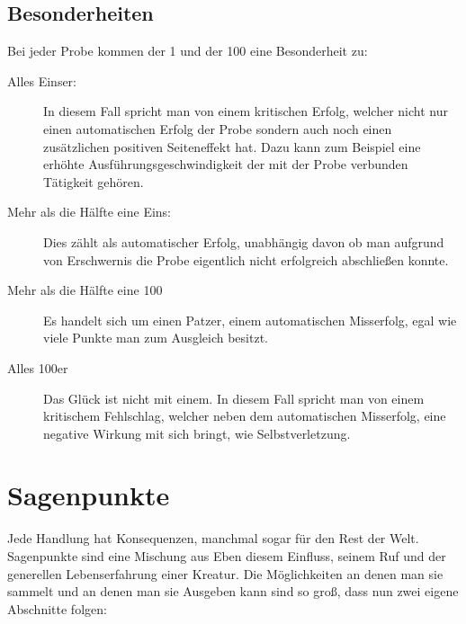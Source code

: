 \documentclass[a4paper,12pt,oneside]{book}
\begin{document}
\section{Besonderheiten}
Bei jeder Probe kommen der 1 und der 100 eine Besonderheit zu:
\begin{description}
\item[Alles Einser:]
In diesem Fall spricht man von einem kritischen Erfolg, welcher nicht nur einen automatischen Erfolg der Probe sondern auch noch einen zusätzlichen positiven Seiteneffekt hat. Dazu kann zum Beispiel eine erhöhte Ausführungsgeschwindigkeit der mit der Probe verbunden Tätigkeit gehören.
\item[Mehr als die Hälfte eine Eins:]
Dies zählt als automatischer Erfolg, unabhängig davon ob man aufgrund von Erschwernis die Probe eigentlich nicht erfolgreich abschließen konnte.
\item[Mehr als die Hälfte eine 100]
Es handelt sich um einen Patzer, einem automatischen Misserfolg, egal wie viele Punkte man zum Ausgleich besitzt.
\item[Alles 100er]
Das Glück ist nicht mit einem. In diesem Fall spricht man von einem kritischem Fehlschlag, welcher neben dem automatischen Misserfolg, eine negative Wirkung mit sich bringt, wie Selbstverletzung.
\end{description}

\chapter{Sagenpunkte}
Jede Handlung hat Konsequenzen, manchmal sogar für den Rest der Welt. Sagenpunkte sind eine Mischung aus Eben diesem Einfluss, seinem Ruf und der generellen Lebenserfahrung einer Kreatur. Die Möglichkeiten an denen man sie sammelt und an denen man sie Ausgeben kann sind so groß, dass nun zwei eigene Abschnitte folgen:
\end{document}
